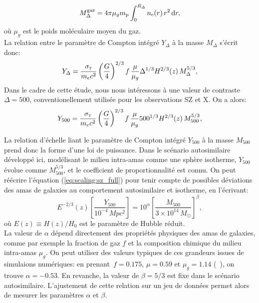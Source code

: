 \begin{equation}
    M_\Delta^{\rm gaz} = 4\pi \mu_g m_{\rm p} \int_0^{R_\Delta} n_{\rm e}(r) \, r^2 \, \mathrm{d} r,
\end{equation}
où $\mu_g$ est le poids moléculaire moyen du gaz. \\
La relation entre le paramètre de Compton intégré $Y_\Delta$ à la masse $M_\Delta$ s'écrit donc:
\begin{equation}
    Y_\Delta = \frac{\sigma_\textsc{t}}{m_e c^2} \left(\frac{G}{4}\right)^{2/3} f\, \frac{\mu}{\mu_g} \Delta^{1/3} H^{2/3}(z) \, M_\Delta^{5/3},
\end{equation}
Dans le cadre de cette étude, nous nous intéressons à une valeur de contraste $\Delta=500$, conventionellement utilisée pour les observations SZ et X.
On a alors:
\begin{equation}
    \label{eq:scaling:sz_full}
    Y_{500} = \frac{\sigma_\textsc{t}}{m_e c^2} \left(\frac{G}{4}\right)^{2/3} f\, \frac{\mu}{\mu_g} 500^{1/3} H^{2/3}(z) \, M_{500}^{5/3},
\end{equation}

La relation d'échelle liant le paramètre de Compton intégré $Y_{500}$ à la masse $M_{500}$ prend donc la forme d'une loi de puissance.
Dans le scénario autosimilaire développé ici, modélisant le milieu intra-amas comme une sphère isotherme, $Y_{500}$ évolue comme $M_{500}^{5/3}$, et le coefficient de proportionnalité est connu.
On peut réécrire l'équation (\ref{eq:scaling:sz_full}) pour tenir compte de possibles déviations des amas de galaxies au comportement autosimilaire et isotherme, en l'écrivant:
\begin{equation}
    \label{eq:sz_scaling}
    E^{-2/3}(z) \left[\frac{Y_{500}}{10^{-4} \,\unit{Mpc^2}}\right] = 10^\alpha \left[\frac{M_{500}}{3 \times 10^{14} \,M_\odot}\right]^\beta,
\end{equation}
où $E(z) \equiv H(z)/H_0$ est le paramètre de Hubble réduit. \\
La valeur de $\alpha$ dépend directement des propriétés physiques des amas de galaxies, comme par exemple la fraction de gaz $f$ et la composition chimique du milieu intra-amas $\mu_g$.
On peut utiliser des valeurs typiques de ces grandeurs issues de simulaions numériques: en prenant $\,f = 0.175$, $\mu = 0.59$ et $\mu_g = 1.14$ (\eg\ \cite{arnaud_universal_2010}), on trouve $\alpha = -0.53$.
En revanche, la valeur de $\beta = 5/3$ est fixe dans le scénario autosimilaire.
L'ajustement de cette relation sur un jeu de données permet alors de mesurer les paramètres $\alpha$ et $\beta$.


